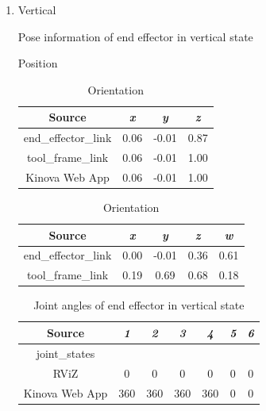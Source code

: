 \documentclass[12pt]{article}
\begin{document}
\begin{enumerate}
\begin{enumerate}
        \item Vertical
        
        \begin{table}[H]
            \caption{Pose information of end effector in vertical state}
            \begin{subtable}{.4\linewidth}
                \centering
                \caption{Position}
                \begin{tabular}{cccc}
                    \toprule
                    Source & \textit{x} & \textit{y} & \textit{z} \\\midrule
                    end\_effector\_link & 0.06 & -0.01 & 0.87 \\
                    tool\_frame\_link & 0.06 & -0.01 & 1.00 \\
                    Kinova Web App & 0.06 & -0.01 & 1.00 \\\bottomrule
                \end{tabular}
            \end{subtable}
            \hfill
            \begin{subtable}{.52\linewidth}
                \centering
                \caption{Orientation}
                \begin{tabular}{ccccc}
                    \toprule
                    Source & \textit{x} & \textit{y} & \textit{z} & \textit{w} \\\midrule
                    end\_effector\_link & 0.00 & -0.01 & 0.36 & 0.61 \\
                    tool\_frame\_link & 0.19 & 0.69 & 0.68 & 0.18 \\\bottomrule
                \end{tabular}
            \end{subtable}
        \end{table}
        \vspace{-10pt}
        \begin{table}[H]
            \centering
            \caption{Joint angles of end effector in vertical state}
            \begin{tabular}{ccccccc}
            \toprule
            Source & \textit{1} & \textit{2} & \textit{3} & \textit{4} & \textit{5} & \textit{6} \\\midrule
            joint\_states & & & & & & \\
            RViZ & 0 & 0 & 0 & 0 & 0 & 0 \\
            Kinova Web App & 360 & 360 & 360 & 360 & 0 & 0 \\\bottomrule
            \end{tabular}
        \end{table}


\end{enumerate}
\end{enumerate}
\end{document}
